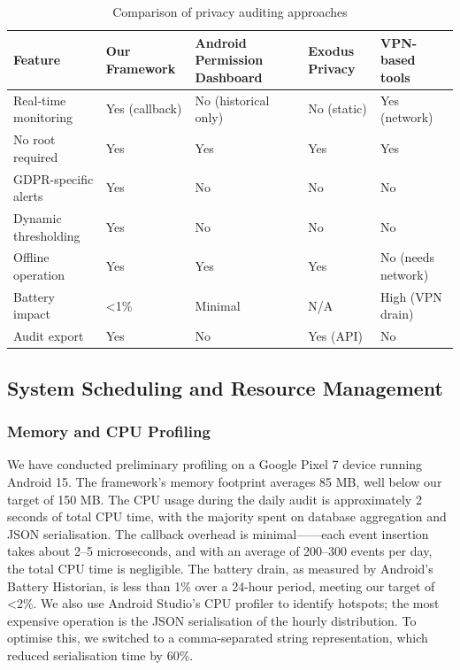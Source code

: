 \begin{table}[H]
\centering
\caption{Comparison of privacy auditing approaches}
\label{tab:comparison}
\begin{tabular}{p{3cm}|p{3cm}|p{3cm}|p{3cm}}
\toprule
\textbf{Feature} & \textbf{Our Framework} & \textbf{Android Permission Dashboard} & \textbf{Exodus Privacy} & \textbf{VPN-based tools} \\
\midrule
Real-time monitoring & Yes (callback) & No (historical only) & No (static) & Yes (network) \\
No root required & Yes & Yes & Yes & Yes \\
GDPR-specific alerts & Yes & No & No & No \\
Dynamic thresholding & Yes & No & No & No \\
Offline operation & Yes & Yes & Yes & No (needs network) \\
Battery impact & <1\% & Minimal & N/A & High (VPN drain) \\
Audit export & Yes & No & Yes (API) & No \\
\bottomrule
\end{tabular}
\end{table}

\subsection{System Scheduling and Resource Management}

\subsubsection{Memory and CPU Profiling}

We have conducted preliminary profiling on a Google Pixel 7 device running Android 15. The framework's memory footprint averages 85 MB, well below our target of 150 MB. The CPU usage during the daily audit is approximately 2 seconds of total CPU time, with the majority spent on database aggregation and JSON serialisation. The callback overhead is minimal——each event insertion takes about 2–5 microseconds, and with an average of 200–300 events per day, the total CPU time is negligible. The battery drain, as measured by Android's Battery Historian, is less than 1\% over a 24-hour period, meeting our target of <2\%. We also use Android Studio's CPU profiler to identify hotspots; the most expensive operation is the JSON serialisation of the hourly distribution. To optimise this, we switched to a comma-separated string representation, which reduced serialisation time by 60\%.

